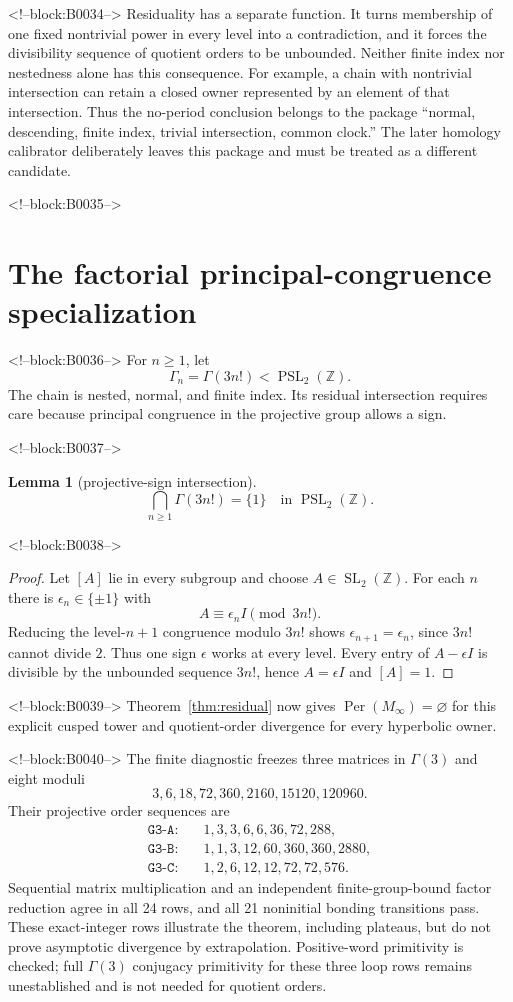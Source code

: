 \documentclass[11pt]{article}
\newtheorem{lemma}[theorem]{Lemma}
\theoremstyle{definition}
\theoremstyle{remark}
\newcommand{\ZZ}{\mathbb Z}
\newcommand{\Per}{\operatorname{Per}}
\begin{document}
<!--block:B0034-->
Residuality has a separate function. It turns membership of one fixed nontrivial power in every level into a contradiction, and it forces the divisibility sequence of quotient orders to be unbounded. Neither finite index nor nestedness alone has this consequence. For example, a chain with nontrivial intersection can retain a closed owner represented by an element of that intersection. Thus the no-period conclusion belongs to the package ``normal, descending, finite index, trivial intersection, common clock.'' The later homology calibrator deliberately leaves this package and must be treated as a different candidate.

<!--block:B0035-->
\section{The factorial principal-congruence specialization}

<!--block:B0036-->
For $n\geq1$, let
\[
\Gamma_n=\Gamma(3n!)<\operatorname{PSL}_2(\ZZ).
\]
The chain is nested, normal, and finite index. Its residual intersection requires care because principal congruence in the projective group allows a sign.

<!--block:B0037-->
\begin{lemma}[projective-sign intersection]\label{lem:sign}
\[
\bigcap_{n\geq1}\Gamma(3n!)=\{1\}
\quad\text{in }\operatorname{PSL}_2(\ZZ).
\]
\end{lemma}

<!--block:B0038-->
\begin{proof}
Let $[A]$ lie in every subgroup and choose $A\in\operatorname{SL}_2(\ZZ)$. For each $n$ there is $\epsilon_n\in\{\pm1\}$ with
\[
A\equiv\epsilon_nI\pmod{3n!}.
\]
Reducing the level-$n+1$ congruence modulo $3n!$ shows $\epsilon_{n+1}=\epsilon_n$, since $3n!$ cannot divide $2$. Thus one sign $\epsilon$ works at every level. Every entry of $A-\epsilon I$ is divisible by the unbounded sequence $3n!$, hence $A=\epsilon I$ and $[A]=1$.
\end{proof}

<!--block:B0039-->
Theorem~\ref{thm:residual} now gives $\Per(M_\infty)=\varnothing$ for this explicit cusped tower and quotient-order divergence for every hyperbolic owner.

<!--block:B0040-->
The finite diagnostic freezes three matrices in $\Gamma(3)$ and eight moduli
\[
3,6,18,72,360,2160,15120,120960.
\]
Their projective order sequences are
\begin{align*}
\texttt{G3-A}:&\quad1,3,3,6,6,36,72,288,\\
\texttt{G3-B}:&\quad1,1,3,12,60,360,360,2880,\\
\texttt{G3-C}:&\quad1,2,6,12,12,72,72,576.
\end{align*}
Sequential matrix multiplication and an independent finite-group-bound factor reduction agree in all 24 rows, and all 21 noninitial bonding transitions pass. These exact-integer rows illustrate the theorem, including plateaus, but do not prove asymptotic divergence by extrapolation. Positive-word primitivity is checked; full $\Gamma(3)$ conjugacy primitivity for these three loop rows remains unestablished and is not needed for quotient orders.
\end{document}
